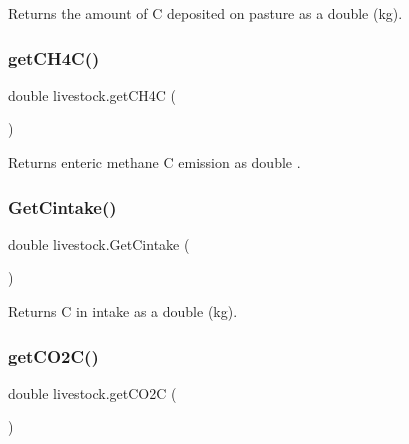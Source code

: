 Returns the amount of C deposited on pasture as a double (kg). 

\mbox{\label{classlivestock_a8dc55a0cba9604b37b2e458dd4754966}} 
\subsubsection{\texorpdfstring{getCH4C()}{getCH4C()}}
{\footnotesize\ttfamily double livestock.\+get\+C\+H4C (\begin{DoxyParamCaption}{ }\end{DoxyParamCaption})\hspace{0.3cm}{\ttfamily [inline]}}



Returns enteric methane C emission as double . 

\mbox{\label{classlivestock_a316a05898f5579f7ed1f5b74655785c2}} 
\subsubsection{\texorpdfstring{GetCintake()}{GetCintake()}}
{\footnotesize\ttfamily double livestock.\+Get\+Cintake (\begin{DoxyParamCaption}{ }\end{DoxyParamCaption})\hspace{0.3cm}{\ttfamily [inline]}}



Returns C in intake as a double (kg). 

\mbox{\label{classlivestock_a20a18f7a7c6e04d1f851eccf01cefb25}} 
\subsubsection{\texorpdfstring{getCO2C()}{getCO2C()}}
{\footnotesize\ttfamily double livestock.\+get\+C\+O2C (\begin{DoxyParamCaption}{ }\end{DoxyParamCaption})\hspace{0.3cm}{\ttfamily [inline]}}



